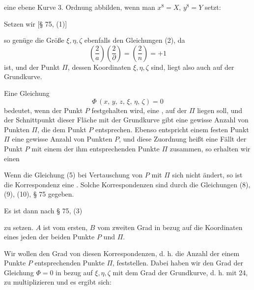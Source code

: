 eine ebene Kurve 3. Ordnung abbilden, wenn man $x^8=X$,
$y^8=Y$ setzt:


Setzen wir [§ 75, (1)]


so genüge die Größe $\xi, \eta, \zeta$ ebenfalls den Gleichungen (2), da %
\[
\left(\dfrac{2}{a}\right)\left(\dfrac{2}{\partial}\right)=\left(\dfrac{2}{n}\right)=+1
\]
ist, und der Punkt $\Pi$, dessen Koordinaten $\xi, \eta, \zeta$ sind, liegt also auch
auf der Grundkurve.

Eine Gleichung
\[
\Phi\,(x,\,y,\,z,\,\xi,\,\eta,\,\zeta)=0
\]
bedeutet, wenn der Punkt $P$ festgehalten wird, eine , auf
der $\Pi$ liegen soll, und der Schnittpunkt dieser Fläche mit der
Grundkurve gibt eine gewisse Anzahl von Punkten $\Pi$, die dem
Punkt $P$ entsprechen. Ebenso entspricht einem festen Punkt $\Pi$
eine gewisse Anzahl von Punkten $P$, und diese Zuordnung heißt
eine  Fällt der Punkt $P$
mit einem der ihm entsprechenden Punkte $\Pi$ zusammen, so erhalten wir einen 

Wenn die Gleichung (5) bei Vertauschung von $P$ mit $\Pi$ sich
nicht ändert, so ist die Korrespondenz eine .
Solche Korrespondenzen sind durch die Gleichungen (8), (9),
(10), § 75 gegeben.

Es ist dann nach § 75, (3)


zu setzen. $A$ ist vom ersten, $B$ vom zweiten Grad in bezug auf
die Koordinaten eines jeden der beiden Punkte $P$ und $\Pi$.

Wir wollen den Grad von diesen Korrespondenzen, d. h. die
Anzahl der einem Punkte $P$ entsprechenden Punkte $\Pi$, feststellen. Dabei haben wir den Grad der Gleichung $\Phi=0$ in
bezug auf $\xi, \eta, \zeta$ mit dem Grad der Grundkurve, d. h. mit 24,
zu multiplizieren und es ergibt sich:
